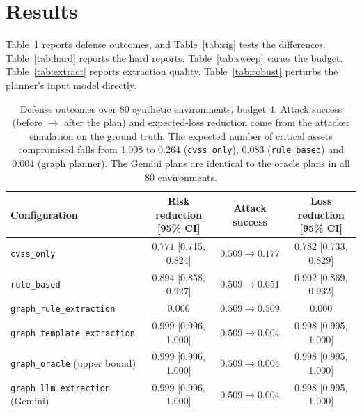 \documentclass[11pt]{article}
\begin{document}
\section{Results}
Table~\ref{tab:defense} reports defense outcomes, and Table~\ref{tab:sig} tests the differences. Table~\ref{tab:hard} reports the hard reports. Table~\ref{tab:sweep} varies the budget. Table~\ref{tab:extract} reports extraction quality. Table~\ref{tab:robust} perturbs the planner's input model directly.

\begin{table}[h]
\centering
\small
\setlength{\tabcolsep}{4pt}
\begin{tabular}{lccc}
\toprule
Configuration & Risk reduction [95\% CI] & Attack success & Loss reduction [95\% CI] \\
\midrule
\texttt{cvss\_only} & $0.771$ [0.715, 0.824] & $0.509 \rightarrow 0.177$ & $0.782$ [0.733, 0.829] \\
\texttt{rule\_based} & $0.894$ [0.858, 0.927] & $0.509 \rightarrow 0.051$ & $0.902$ [0.869, 0.932] \\
\texttt{graph\_rule\_extraction} & $0.000$ & $0.509 \rightarrow 0.509$ & $0.000$ \\
\texttt{graph\_template\_extraction} & $0.999$ [0.996, 1.000] & $0.509 \rightarrow 0.004$ & $0.998$ [0.995, 1.000] \\
\texttt{graph\_oracle} (upper bound) & $0.999$ [0.996, 1.000] & $0.509 \rightarrow 0.004$ & $0.998$ [0.995, 1.000] \\
\texttt{graph\_llm\_extraction} (Gemini) & $0.999$ [0.996, 1.000] & $0.509 \rightarrow 0.004$ & $0.998$ [0.995, 1.000] \\
\bottomrule
\end{tabular}
\caption{Defense outcomes over 80 synthetic environments, budget 4. Attack success (before $\rightarrow$ after the plan) and expected-loss reduction come from the attacker simulation on the ground truth. The expected number of critical assets compromised falls from 1.008 to 0.264 (\texttt{cvss\_only}), 0.083 (\texttt{rule\_based}) and 0.004 (graph planner). The Gemini plans are identical to the oracle plans in all 80 environments.}
\label{tab:defense}
\end{table}
\end{document}

